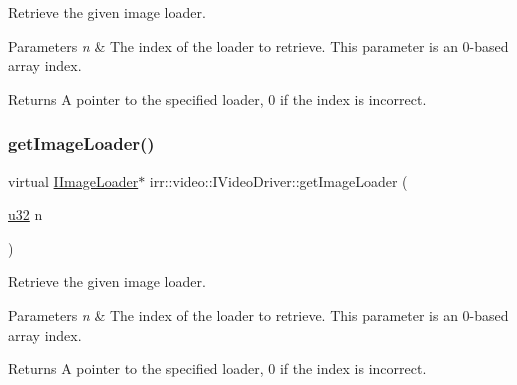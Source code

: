 Retrieve the given image loader. 


\begin{DoxyParams}{Parameters}
{\em n} & The index of the loader to retrieve. This parameter is an 0-\/based array index. \\
\hline
\end{DoxyParams}
\begin{DoxyReturn}{Returns}
A pointer to the specified loader, 0 if the index is incorrect. 
\end{DoxyReturn}
\mbox{\label{classirr_1_1video_1_1IVideoDriver_a5cc08e7cd2ce2a30275e22ce13bb1013}} 
\subsubsection{\texorpdfstring{get\+Image\+Loader()}{getImageLoader()}\hspace{0.1cm}{\footnotesize\ttfamily [2/2]}}
{\footnotesize\ttfamily virtual \hyperlink{classirr_1_1video_1_1IImageLoader}{I\+Image\+Loader}$\ast$ irr\+::video\+::\+I\+Video\+Driver\+::get\+Image\+Loader (\begin{DoxyParamCaption}\item[{\hyperlink{namespaceirr_a0416a53257075833e7002efd0a18e804}{u32}}]{n }\end{DoxyParamCaption})\hspace{0.3cm}{\ttfamily [pure virtual]}}



Retrieve the given image loader. 


\begin{DoxyParams}{Parameters}
{\em n} & The index of the loader to retrieve. This parameter is an 0-\/based array index. \\
\hline
\end{DoxyParams}
\begin{DoxyReturn}{Returns}
A pointer to the specified loader, 0 if the index is incorrect. 
\end{DoxyReturn}
\mbox{\label{classirr_1_1video_1_1IVideoDriver_a92535921ad01c90570533ba60b0b76b2}} 
